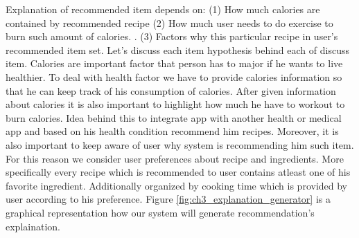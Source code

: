 Explanation of recommended item depends on: (1) How much calories are contained by recommended recipe (2) How much user needs to do exercise to burn such amount of calories. . (3) Factors why this particular recipe in user’s recommended item set. Let’s discuss each item hypothesis behind each of discuss item. Calories are important factor that person has to major if he wants to live healthier. To deal with health factor we have to provide calories information so that he can keep track of his consumption of calories. After given information about calories it is also important to highlight how much he have to workout to burn calories. Idea behind this to integrate app with another health or medical app and based on his health condition recommend him recipes. Moreover, it is also important to keep aware of user why system is recommending him such item. For this reason we consider user preferences about recipe and ingredients. More specifically every recipe which is recommended to user contains atleast one of his favorite ingredient. Additionally organized by cooking time which is provided by user according to his preference. Figure \ref{fig:ch3_explanation_generator} is a graphical representation how our system will generate recommendation’s explaination.

